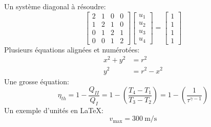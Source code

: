 \documentclass[a4paper,12pt]{scrartcl}
\begin{document}
Un système diagonal à résoudre:
\begin{equation}
	\begin{bmatrix}
		2 & 1 & 0 & 0\\
		1 & 2 & 1 & 0\\
		0 & 1 & 2 & 1\\
		0 & 0 & 1 & 2
	\end{bmatrix}
	\begin{bmatrix}
		u_1 \\ u_2 \\ u_3 \\ u_4
	\end{bmatrix} =
	\begin{bmatrix}
		1 \\ 1 \\ 1 \\ 1
	\end{bmatrix}
\end{equation}
Plusieurs équations alignées et numérotées:
\begin{align}
	x^2 + y^2 &= r^2 \\
	y^2 &= r^2 - x^2
\end{align}
Une grosse équation:
\begin{equation} 
	\eta_{th} = 1 - \frac{Q_{II}}{Q_I} = 1 - \left(\frac{T_4-T_1}{T_3-T_2}\right) = 1 - \left(\frac{1}{\tau^{\gamma-1}}\right) 
\end{equation}
Un exemple d'unités en \LaTeX:
\begin{equation}
	v_\mathrm{max} = \SI{300}{\meter\per\second}
\end{equation}
\end{document}
